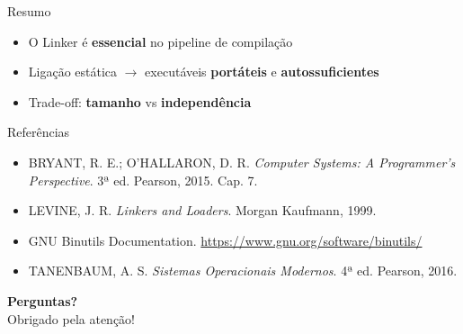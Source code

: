 \documentclass[aspectratio=169, 11pt]{beamer}
\begin{document}
\begin{frame}{Resumo}
  \begin{center}
  \end{center}
  \vspace{0.5cm}
  \begin{itemize}
    \item O Linker é \textbf{essencial} no pipeline de compilação
    \item Ligação estática $\rightarrow$ executáveis \textbf{portáteis} e \textbf{autossuficientes}
    \item Trade-off: \textbf{tamanho} vs \textbf{independência}
  \end{itemize}
\end{frame}

\begin{frame}{Referências}
  \begin{itemize}
    \item BRYANT, R. E.; O'HALLARON, D. R. \textit{Computer Systems: A Programmer's Perspective}. 3ª ed. Pearson, 2015. Cap. 7.
    \item LEVINE, J. R. \textit{Linkers and Loaders}. Morgan Kaufmann, 1999.
    \item GNU Binutils Documentation. \url{https://www.gnu.org/software/binutils/}
    \item TANENBAUM, A. S. \textit{Sistemas Operacionais Modernos}. 4ª ed. Pearson, 2016.
  \end{itemize}
\end{frame}

{
\begin{frame}[plain]
  \begin{center}
    \vspace{2.5cm}
    {\Huge\color{white}\textbf{Perguntas?}}\\[1cm]
    {\large\color{accent!60!white} Obrigado pela atenção!}\\[0.5cm]
  \end{center}
\end{frame}
}
\end{document}
